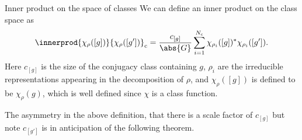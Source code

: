\begin{dfn}{Inner product on the space of classes}{}
    We can define an inner product on the class space as
    \begin{equation}
        \innerprod{\chi_\rho([g])}{\chi_\rho([g'])}_{\mathrm{c}} =
        \frac{c_{[g]}}{\abs{G}} \sum_{i = 1}^{N_{\mathrm{c}}}
        \chi_{\rho_i}([g])^*\chi_{\rho_i}([g']).
    \end{equation}
    Here \(c_{[g]}\) is the size of the conjugacy class containing \(g\),
    \(\rho_i\) are the irreducible representations appearing in the decomposition of
    \(\rho\), and \(\chi_\rho([g])\) is defined to be \(\chi_\rho(g)\), which is
    well defined since \(\chi\) is a class function.
\end{dfn}

The asymmetry in the above definition, that there is a scale factor of
\(c_{[g]}\) but note \(c_{[g']}\) is in anticipation of the following theorem.


